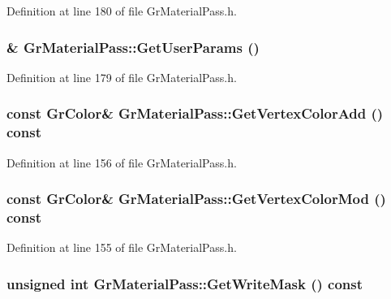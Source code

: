 Definition at line 180 of file GrMaterialPass.h.\hypertarget{class_gr_material_pass_7961e2a4d2fbd45128fa21cac4f32f30}{
\subsubsection[{GetUserParams}]{\& GrMaterialPass::GetUserParams ()}}
\label{class_gr_material_pass_7961e2a4d2fbd45128fa21cac4f32f30}




Definition at line 179 of file GrMaterialPass.h.\hypertarget{class_gr_material_pass_9bf48a9c92c48fe9edea9ee9c5f23550}{
\subsubsection[{GetVertexColorAdd}]{\setlength{\rightskip}{0pt plus 5cm}const {\bf GrColor}\& GrMaterialPass::GetVertexColorAdd () const}}
\label{class_gr_material_pass_9bf48a9c92c48fe9edea9ee9c5f23550}




Definition at line 156 of file GrMaterialPass.h.\hypertarget{class_gr_material_pass_d806a37ef0afb86d3e5856f4cefa89d9}{
\subsubsection[{GetVertexColorMod}]{\setlength{\rightskip}{0pt plus 5cm}const {\bf GrColor}\& GrMaterialPass::GetVertexColorMod () const}}
\label{class_gr_material_pass_d806a37ef0afb86d3e5856f4cefa89d9}




Definition at line 155 of file GrMaterialPass.h.\hypertarget{class_gr_material_pass_ce9bd1f84b590d9916f84b123d89dbeb}{
\subsubsection[{GetWriteMask}]{\setlength{\rightskip}{0pt plus 5cm}unsigned int GrMaterialPass::GetWriteMask () const}}
\label{class_gr_material_pass_ce9bd1f84b590d9916f84b123d89dbeb}




